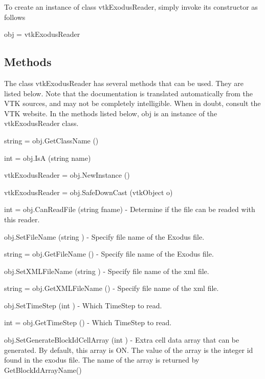 To create an instance of class vtk\-Exodus\-Reader, simply invoke its constructor as follows \begin{DoxyVerb}  obj = vtkExodusReader
\end{DoxyVerb}
 \hypertarget{vtkwidgets_vtkxyplotwidget_Methods}{}\subsection{Methods}\label{vtkwidgets_vtkxyplotwidget_Methods}
The class vtk\-Exodus\-Reader has several methods that can be used. They are listed below. Note that the documentation is translated automatically from the V\-T\-K sources, and may not be completely intelligible. When in doubt, consult the V\-T\-K website. In the methods listed below, {\ttfamily obj} is an instance of the vtk\-Exodus\-Reader class. 
\begin{DoxyItemize}
\item {\ttfamily string = obj.\-Get\-Class\-Name ()}  
\item {\ttfamily int = obj.\-Is\-A (string name)}  
\item {\ttfamily vtk\-Exodus\-Reader = obj.\-New\-Instance ()}  
\item {\ttfamily vtk\-Exodus\-Reader = obj.\-Safe\-Down\-Cast (vtk\-Object o)}  
\item {\ttfamily int = obj.\-Can\-Read\-File (string fname)} -\/ Determine if the file can be readed with this reader.  
\item {\ttfamily obj.\-Set\-File\-Name (string )} -\/ Specify file name of the Exodus file.  
\item {\ttfamily string = obj.\-Get\-File\-Name ()} -\/ Specify file name of the Exodus file.  
\item {\ttfamily obj.\-Set\-X\-M\-L\-File\-Name (string )} -\/ Specify file name of the xml file.  
\item {\ttfamily string = obj.\-Get\-X\-M\-L\-File\-Name ()} -\/ Specify file name of the xml file.  
\item {\ttfamily obj.\-Set\-Time\-Step (int )} -\/ Which Time\-Step to read.  
\item {\ttfamily int = obj.\-Get\-Time\-Step ()} -\/ Which Time\-Step to read.  
\item {\ttfamily obj.\-Set\-Generate\-Block\-Id\-Cell\-Array (int )} -\/ Extra cell data array that can be generated. By default, this array is O\-N. The value of the array is the integer id found in the exodus file. The name of the array is returned by Get\-Block\-Id\-Array\-Name()  

\end{DoxyItemize}

